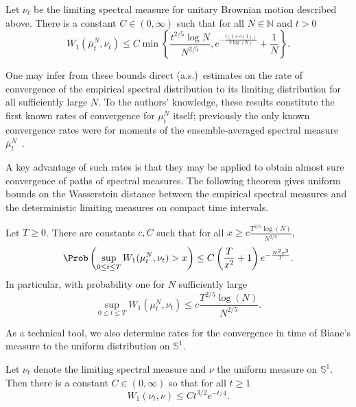 \begin{thm}\label{T:main-nu-t}
Let $\nu_t$ be the limiting spectral measure for unitary Brownian motion described above. There is a constant $C\in(0,\infty)$ such that for all $N\in\mathbb{N}$ and $t>0$
\[
W_1(\overline{\mu}_t^N,\nu_t)\le C\min\left\{\frac{t^{2/5}\log N}{N^{2/5}},e^{-\frac{t(1+o(1))}{8\log(N)}}+\frac{1}{N}\right\}.
\]
\end{thm} One may infer from these bounds direct (a.s.)~estimates on the rate of convergence of the empirical spectral distribution to its limiting distribution for all sufficiently large $N$. To the authors' knowledge, these results constitute the first known rates of convergence for $\mu_t^N$ itself; previously the only known convergence rates were for moments of the ensemble-averaged spectral measure $\overline{\mu}^N_t$~\cite{CDK2016}.

A key advantage of such rates is that they may be applied to obtain almost sure convergence of paths of spectral measures. The following theorem gives uniform bounds on the Wasserstein distance between the empirical spectral measures and the deterministic limiting measures on compact time intervals.

\begin{thm}\label{T:close-paths}
Let $T\ge 0$. There are constants $c,C$ such that for all $x\ge c\frac{T^{2/5}\log(N)}{N^{2/5}},$
\begin{align*}
\Prob\left(\sup_{0\le t\le
T}W_1(\mu^N_t,\nu_t)>x\right)\le C\left(\frac{T}{x^2}+1\right)e^{-\frac{N^2x^2}{T}}.
\end{align*}
In particular, with probability one for $N$ sufficiently large
\[
\sup_{0\le t\le T}W_1(\mu^N_t,\nu_t)\le c\frac{T^{2/5}\log(N)}{N^{2/5}}.
\]
\end{thm}

As a technical tool, we also determine rates for the convergence in time of Biane's measure to the uniform distribution on $\mathbb{S}^1$.

\begin{prop}\label{T:biane-to-uniform}
Let $\nu_t$ denote the limiting spectral measure and $\nu$ the uniform measure on $\mathbb{S}^1$. Then there is a constant $C\in(0,\infty)$ so that for all $t\ge1$
\[
W_1(\nu_t,\nu)\le Ct^{3/2}e^{-t/4}.
\]
\end{prop}

